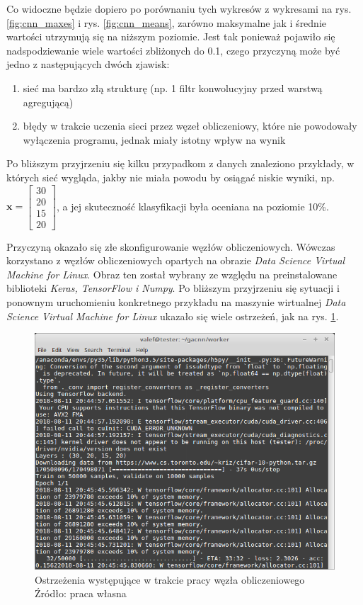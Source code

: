 Co widoczne będzie dopiero po porównaniu tych wykresów z wykresami na rys. \ref{fig:cnn_maxes} i rys. \ref{fig:cnn_means}, zarówno maksymalne jak i średnie wartości utrzymują się na niższym poziomie.
Jest tak ponieważ pojawiło się nadspodziewanie wiele wartości zbliżonych do 0.1, czego przyczyną może być jedno z następujących dwóch zjawisk:
\begin{enumerate}
  \item sieć ma bardzo złą strukturę (np. 1 filtr konwolucyjny przed warstwą agregującą)
  \item błędy w trakcie uczenia sieci przez węzeł obliczeniowy, które nie powodowały wyłączenia programu, jednak miały istotny wpływ na wynik
\end{enumerate}
Po bliższym przyjrzeniu się kilku przypadkom z danych znaleziono przykłady, w których sieć wygląda, jakby nie miała powodu by osiągać niskie wyniki, np. $\mathbf{x} = \begin{bmatrix}30 \\ 20 \\ 15 \\ 20\end{bmatrix}$, a  jej skuteczność klasyfikacji była oceniana na poziomie 10\%.

Przyczyną okazało się złe skonfigurowanie węzłów obliczeniowych.
Wówczas korzystano z węzłów obliczeniowych opartych na obrazie \textit{Data Science Virtual Machine for Linux}.
Obraz ten został wybrany ze względu na preinstalowane biblioteki \textit{Keras, TensorFlow i Numpy}.
Po bliższym przyjrzeniu się sytuacji i ponownym uruchomieniu konkretnego przykładu na maszynie wirtualnej \textit{Data Science Virtual Machine for Linux} ukazało się wiele ostrzeżeń, jak na rys. \ref{fig:warnings}.

\begin{figure}[h!tb]
	 \centering
	 \includegraphics[width = 0.9\linewidth]{img/warnings}
	 \caption{Ostrzeżenia występujące w trakcie pracy węzła obliczeniowego  \\
              Źródło: praca własna}
	 \label{fig:warnings}
\end{figure}

